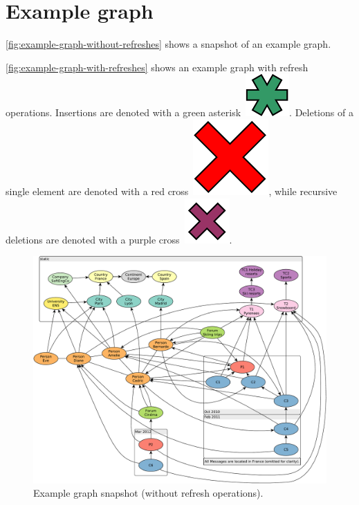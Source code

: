 \chapter{Example graph}
\label{sec:example-graph}

\autoref{fig:example-graph-without-refreshes} shows a snapshot of an example graph.

\autoref{fig:example-graph-with-refreshes} shows an example graph with refresh operations.
Insertions are denoted with a green asterisk~\includegraphics[scale=0.25]{patterns/insert}.
Deletions of a single element are denoted with a red cross~\includegraphics[scale=0.25]{patterns/delete-single},
while recursive deletions are denoted with a purple cross~\includegraphics[scale=0.25]{patterns/delete-recursively}.

\begin{figure}[ht]
    \centering
    \includegraphics[scale=\yedscale]{figures/example-graph-without-refreshes}
    \caption{Example graph snapshot (without refresh operations).}
    \label{fig:example-graph-without-refreshes}
\end{figure}

